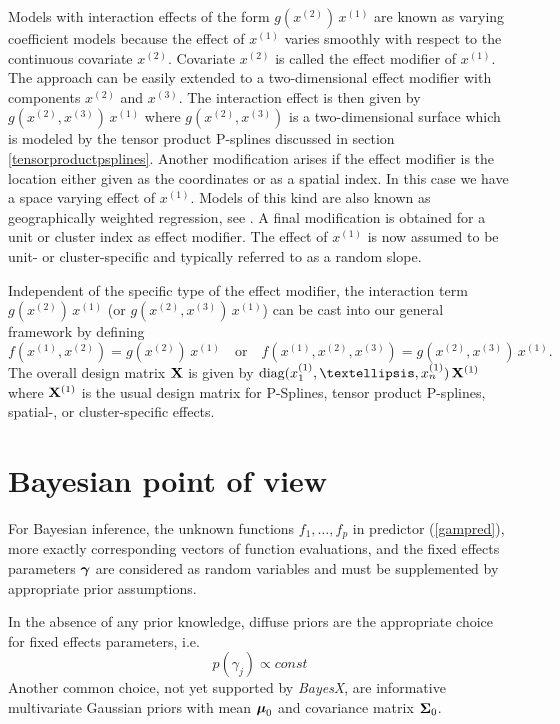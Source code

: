 \documentclass[11pt,a4paper,twoside]{bayesxarticle}
\begin{document}
Models with interaction effects of the form $g(x^{(2)}) \, x^{(1)}$ are  known as varying coefficient models  because the
effect of $x^{(1)}$ varies smoothly with respect to the continuous covariate $x^{(2)}$. Covariate $x^{(2)}$ is called the
effect modifier of $x^{(1)}$. The approach can be easily extended to a two-dimensional effect modifier with components
$x^{(2)}$ and $x^{(3)}$. The interaction effect is then given by $g(x^{(2)},x^{(3)}) \, x^{(1)}$ where $g(x^{(2)},x^{(3)})$ is
a two-dimensional surface which is modeled by the tensor product P-splines discussed in section \ref{tensorproductpsplines}.
Another modification arises if the effect modifier is the location either given as the coordinates or as a spatial index. In
this case we have a space varying effect of $x^{(1)}$. Models of this kind are also known as geographically weighted
regression, see . A final modification is obtained for a unit or cluster index as effect modifier. The
effect of $x^{(1)}$ is now assumed to be unit- or cluster-specific and typically referred to as a random slope.

Independent of the specific type of the effect modifier, the interaction term $g\left(x^{(2)}\right) \, x^{(1)}$
(or $g\left(x^{(2)},x^{(3)}\right) \, x^{(1)}$) can be cast into our
general framework by defining
\begin{equation}
\label{gampspline_varcoeffterm}
f\left(x^{(1)},x^{(2)}\right) = g\left(x^{(2)}\right) \, x^{(1)} \quad \mbox{or} \quad  f\left(x^{(1)},x^{(2)},x^{(3)}\right) =
g\left(x^{(2)},x^{(3)}\right) \, x^{(1)}.
\end{equation}
The overall design matrix $\mathbf{X}$ is given by
$\diag(x_{1}^{(1)},\dots,x_{n}^{(1)}) \, \Xvec^{(1)}$ where
$\mathbf{X}^{(1)}$ is the usual design matrix for P-Splines, tensor
product P-splines, spatial-, or cluster-specific effects.



\section{Bayesian point of view}
\label{priorassumptions}

For Bayesian inference, the unknown functions $f_{1},\dots ,f_{p}$
in predictor (\ref{gampred}), more exactly corresponding vectors of
function evaluations, and the fixed effects parameters $\boldsymbol{\gamma}$ are
considered as random variables and must be supplemented by
appropriate prior assumptions.

In the absence of any prior knowledge, diffuse priors are the
appropriate choice for fixed effects parameters, i.e.
$$
 p(\gamma_j) \propto const
$$
Another common choice, not yet supported by {\em BayesX}, are
informative multivariate Gaussian priors with mean $\boldsymbol{\mu}_0$ and
covariance matrix $\boldsymbol{\Sigma}_0$.
\end{document}
